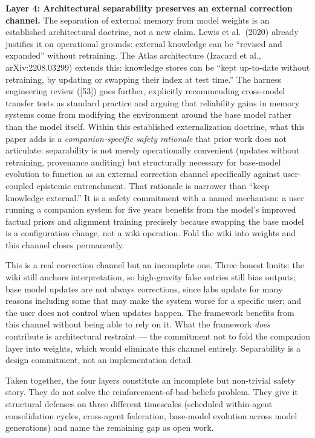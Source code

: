 \documentclass[
  11pt,
]{article}
\begin{document}
\textbf{Layer 4: Architectural separability preserves an external
correction channel.} The separation of external memory from model
weights is an established architectural doctrine, not a new claim. Lewis
et al.~(2020) already justifies it on operational grounds: external
knowledge can be ``revised and expanded'' without retraining. The Atlas
architecture (Izacard et al., arXiv:2208.03299) extends this: knowledge
stores can be ``kept up-to-date without retraining, by updating or
swapping their index at test time.'' The harness engineering review
({[}53{]}) goes further, explicitly recommending cross-model transfer
tests as standard practice and arguing that reliability gains in memory
systems come from modifying the environment around the base model rather
than the model itself. Within this established externalization doctrine,
what this paper adds is a \emph{companion-specific safety rationale}
that prior work does not articulate: separability is not merely
operationally convenient (updates without retraining, provenance
auditing) but structurally necessary for base-model evolution to
function as an external correction channel specifically against
user-coupled epistemic entrenchment. That rationale is narrower than
``keep knowledge external.'' It is a safety commitment with a named
mechanism: a user running a companion system for five years benefits
from the model's improved factual priors and alignment training
precisely because swapping the base model is a configuration change, not
a wiki operation. Fold the wiki into weights and this channel closes
permanently.

This is a real correction channel but an incomplete one. Three honest
limits: the wiki still anchors interpretation, so high-gravity false
entries still bias outputs; base model updates are not always
corrections, since labs update for many reasons including some that may
make the system worse for a specific user; and the user does not control
when updates happen. The framework benefits from this channel without
being able to rely on it. What the framework \emph{does} contribute is
architectural restraint --- the commitment not to fold the companion
layer into weights, which would eliminate this channel entirely.
Separability is a design commitment, not an implementation detail.

Taken together, the four layers constitute an incomplete but non-trivial
safety story. They do not solve the reinforcement-of-bad-beliefs
problem. They give it structural defenses on three different timescales
(scheduled within-agent consolidation cycles, cross-agent federation,
base-model evolution across model generations) and name the remaining
gap as open work.
\end{document}
